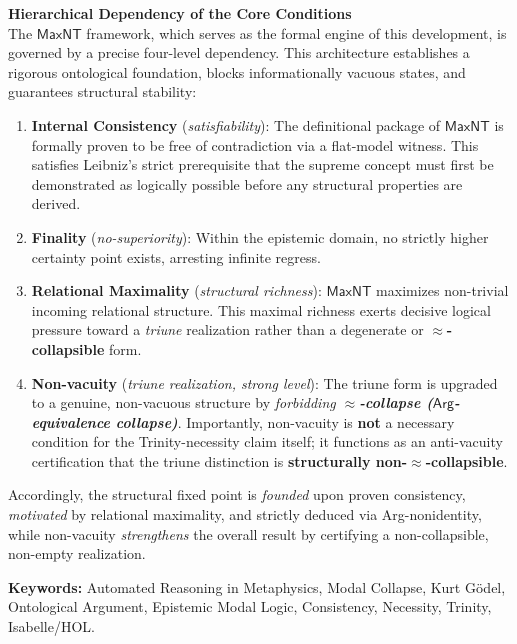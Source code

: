 \documentclass[a4paper, 11pt]{article}
\theoremstyle{plain}
\theoremstyle{definition}
\newcommand{\Arg}{\mathsf{Arg}}           %
\begin{document}
\vspace{1em}
\noindent\textbf{Hierarchical Dependency of the Core Conditions} \\
The \textbf{$\mathsf{MaxNT}$} framework, which serves as the formal engine of this development, is governed by a precise four-level dependency. This architecture establishes a rigorous ontological foundation, blocks informationally vacuous states, and guarantees structural stability:
\begin{enumerate}
  \item \textbf{Internal Consistency} (\emph{satisfiability}): The definitional package of \textbf{$\mathsf{MaxNT}$} is formally proven to be free of contradiction via a flat-model witness. This satisfies Leibniz's strict prerequisite that the supreme concept must first be demonstrated as logically possible before any structural properties are derived.
  \item \textbf{Finality} (\emph{no-superiority}): Within the epistemic domain, no strictly higher certainty point exists, arresting infinite regress.
  \item \textbf{Relational Maximality} (\emph{structural richness}): \textbf{$\mathsf{MaxNT}$} maximizes non-trivial incoming relational structure. This maximal richness exerts decisive logical pressure toward a \emph{triune} realization rather than a degenerate or \textbf{$\approx$-collapsible} form.
  \item \textbf{Non-vacuity} (\emph{triune realization, strong level}): The triune form is upgraded to a genuine, non-vacuous structure by \emph{forbidding \textbf{$\approx$-collapse ($\Arg$-equivalence collapse)}}. Importantly, non-vacuity is \textbf{not} a necessary condition for the Trinity-necessity claim itself; it functions as an anti-vacuity certification that the triune distinction is \textbf{structurally non-$\approx$-collapsible}.
\end{enumerate}

\noindent Accordingly, the structural fixed point is \emph{founded} upon proven consistency, \emph{motivated} by relational maximality, and strictly deduced via Arg-nonidentity, while non-vacuity \emph{strengthens} the overall result by certifying a non-collapsible, non-empty realization.

\vspace{1em}
\noindent\textbf{Keywords:} Automated Reasoning in Metaphysics, Modal Collapse, Kurt G\"odel, Ontological Argument, Epistemic Modal Logic, Consistency, Necessity, Trinity, Isabelle/HOL.
\end{document}
